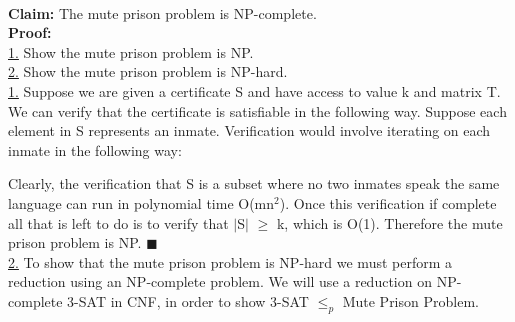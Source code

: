 \documentclass[10pt]{csc_assignment}
\begin{document}
\begin{description}

\newpage
\item[Q1. The Mute Prison]
~\\
\textbf{Claim:} The mute prison problem is NP-complete.\\
\textbf{Proof:}\\
\underline{1.} Show the mute prison problem is NP.\\
\underline{2.} Show the mute prison problem is NP-hard.\\

\underline{1.} Suppose we are given a certificate S and have access to value k and matrix T. We can verify that the certificate is satisfiable in the following way. Suppose each element in S represents an inmate. Verification would involve iterating on each inmate in the following way:\\
\begin{algorithm}[H]
 \LinesNumbered 
{}
\end{algorithm}
Clearly, the verification that S is a subset where no two inmates speak the same language can run in polynomial time O(mn$^{2}$). Once this verification if complete all that is left to do is to verify that $\mid$S$\mid$ $\geqslant$ k, which is O(1). Therefore the mute prison problem is NP. $\blacksquare$\\

\underline{2.} To show that the mute prison problem is NP-hard we must perform a reduction using an NP-complete problem. We will use a reduction on NP-complete 3-SAT in CNF, in order to show 3-SAT $\leqslant_{p}$ Mute Prison Problem.\\


\end{description}
\end{document}
